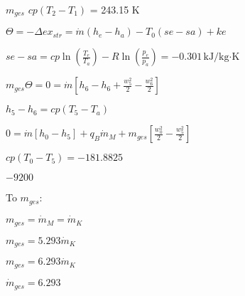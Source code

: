 \( m_{ges} \)  
\( cp(T_2 - T_1) \) = 243.15 K  

\( \Theta = -\Delta ex_{str} = \dot{m}(h_e - h_a) - T_0(se - sa) + ke \)  

\( se - sa = cp \ln \left( \frac{T_e}{T_a} \right) - R \ln \left( \frac{p_e}{p_a} \right) = -0.301 \, \text{kJ/kg·K} \)  

\( m_{ges} \Theta = 0 = \dot{m} \left[ h_6 - h_6 + \frac{w_5^2}{2} - \frac{w_6^2}{2} \right] \)  

\( h_5 - h_6 = cp(T_5 - T_a) \)  

\( 0 = \dot{m} \left[ h_0 - h_5 \right] + q_B \dot{m}_M + m_{ges} \left[ \frac{w_0^2}{2} - \frac{w_5^2}{2} \right] \)  

\( cp(T_0 - T_5) = -181.8825 \)  

\( -9200 \)  

To \( m_{ges} \):  

\( m_{ges} = \dot{m}_M = \dot{m}_K \)  

\( m_{ges} = 5.293 \dot{m}_K \)  

\( m_{ges} = 6.293 \dot{m}_K \)  

\( \dot{m}_{ges} = 6.293 \)